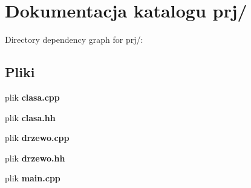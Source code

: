 \section{\-Dokumentacja katalogu prj/}
\label{dir_cffad30e1a37bfd71d57fffe8fbcbb1c}
\-Directory dependency graph for prj/\-:
\subsection*{\-Pliki}
\begin{DoxyCompactItemize}
\item 
plik {\bf clasa.\-cpp}
\item 
plik {\bf clasa.\-hh}
\item 
plik {\bf drzewo.\-cpp}
\item 
plik {\bf drzewo.\-hh}
\item 
plik {\bf main.\-cpp}
\end{DoxyCompactItemize}
